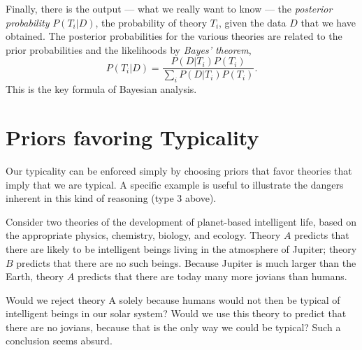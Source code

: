 \documentclass[pra,twocolumn,nofootinbib,eqsecnum,floatfix]{revtex4}
\begin{document}
Finally, there is the output --- what we really want to know --- the {\it posterior probability} $P(T_i|D)$, the
probability of theory $T_i$, given the data $D$ that we have obtained.  The posterior
probabilities for the various theories are related to the prior probabilities and the likelihoods
by {\it Bayes' theorem},
\begin{equation}
P(T_i|D) = \frac{P(D|T_i) P(T_i)}{\sum_i  P(D|T_i) P(T_i)}  .
\label{bayesthm}
\end{equation} 
This is the key formula of Bayesian analysis. 

\section{Priors favoring Typicality} 

Our typicality can be enforced simply by choosing priors that favor theories that imply that we are 
typical. A specific example is useful to illustrate the dangers inherent in this kind of reasoning 
(type 3 above). 

Consider two theories of the development of planet-based intelligent life,
based on the appropriate physics, chemistry, biology, and ecology.
Theory $A$ predicts that there are likely to be intelligent beings living
in the atmosphere of Jupiter; theory $B$ predicts that there are no such beings.
Because Jupiter is much larger than the Earth, theory $A$ predicts that
there are today many more jovians than humans.  

Would we reject theory A solely because humans
would not then be typical of intelligent beings in our solar system? Would we use this theory to predict that there are no jovians, because that is the only way we could be typical?  
Such a conclusion seems absurd.
\end{document}
